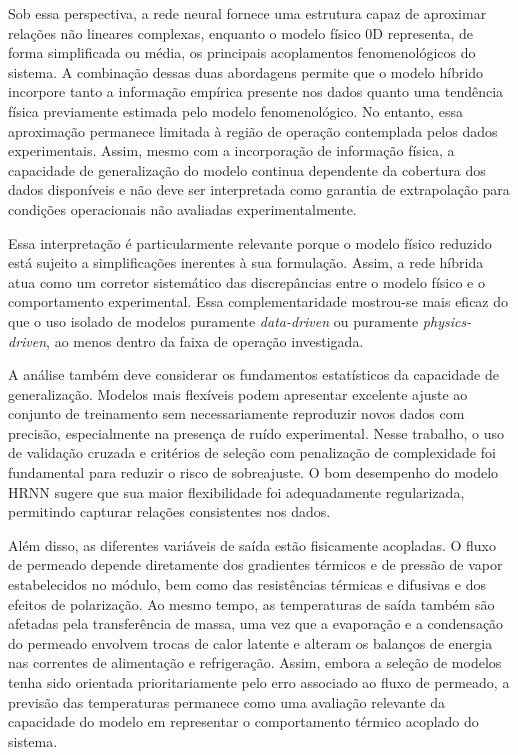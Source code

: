 Sob essa perspectiva, a rede neural fornece uma estrutura capaz de aproximar relações não lineares complexas, enquanto o modelo físico 0D representa, de forma simplificada ou média, os principais acoplamentos fenomenológicos do sistema. A combinação dessas duas abordagens permite que o modelo híbrido incorpore tanto a informação empírica presente nos dados quanto uma tendência física previamente estimada pelo modelo fenomenológico. No entanto, essa aproximação permanece limitada à região de operação contemplada pelos dados experimentais. Assim, mesmo com a incorporação de informação física, a capacidade de generalização do modelo continua dependente da cobertura dos dados disponíveis e não deve ser interpretada como garantia de extrapolação para condições operacionais não avaliadas experimentalmente.

Essa interpretação é particularmente relevante porque o modelo físico reduzido está sujeito a simplificações inerentes à sua formulação. Assim, a rede híbrida atua como um corretor sistemático das discrepâncias entre o modelo físico e o comportamento experimental. Essa complementaridade mostrou-se mais eficaz do que o uso isolado de modelos puramente \textit{data-driven} ou puramente \textit{physics-driven}, ao menos dentro da faixa de operação investigada.

A análise também deve considerar os fundamentos estatísticos da capacidade de generalização. Modelos mais flexíveis podem apresentar excelente ajuste ao conjunto de treinamento sem necessariamente reproduzir novos dados com precisão, especialmente na presença de ruído experimental. Nesse trabalho, o uso de validação cruzada e critérios de seleção com penalização de complexidade foi fundamental para reduzir o risco de sobreajuste. O bom desempenho do modelo HRNN sugere que sua maior flexibilidade foi adequadamente regularizada, permitindo capturar relações consistentes nos dados.


Além disso, as diferentes variáveis de saída estão fisicamente acopladas. O fluxo de permeado depende diretamente dos gradientes térmicos e de pressão de vapor estabelecidos no módulo, bem como das resistências térmicas e difusivas e dos efeitos de polarização. Ao mesmo tempo, as temperaturas de saída também são afetadas pela transferência de massa, uma vez que a evaporação e a condensação do permeado envolvem trocas de calor latente e alteram os balanços de energia nas correntes de alimentação e refrigeração. Assim, embora a seleção de modelos tenha sido orientada prioritariamente pelo erro associado ao fluxo de permeado, a previsão das temperaturas permanece como uma avaliação relevante da capacidade do modelo em representar o comportamento térmico acoplado do sistema.


